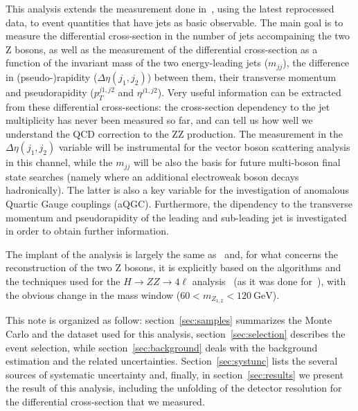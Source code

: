 This analysis extends the measurement done in~\cite{ZZXSPaper}, using the latest reprocessed data, to event quantities that have jets as basic observable. 
The main goal is to measure the differential cross-section in the number of jets accompaining the two Z bosons, as well as the measurement of the 
differential cross-section as a function of the invariant mass of the two energy-leading jets ($m_{jj}$), the  difference in (pseudo-)rapidity ($\Delta \eta(j_1 , j_2)$) between them, their transverse momentum and pseudorapidity ($p_T^{j1,j2}$ and $\eta^{j1,j2}$).
Very useful information can be extracted from these differential cross-sections: the cross-section dependency to the jet multiplicity has never been measured so far, and can tell us how well
we understand the QCD correction to the ZZ production. The measurement in the $\Delta \eta(j_1 , j_2)$ variable will be instrumental for the vector boson scattering analysis in this channel, 
while the $m_{jj}$ will be also the basis for future multi-boson final state searches (namely where an additional electroweak boson decays hadronically). The latter is also a key variable for the investigation of anomalous Quartic Gauge couplings (aQGC). Furthermore, the dipendency to the transverse momentum and pseudorapidity of the leading and sub-leading jet is investigated in order to obtain further information.

The implant of the analysis is largely the same as~\cite{ZZXSPaper} and, for what concerns the reconstruction of the two Z bosons, it is explicitly
based on the algorithms and the techniques used for the $H\rightarrow ZZ \rightarrow 4\ell$ analysis~\cite{HiggsLegacyPaper} (as it was done for~\cite{ZZXSPaper}), with the obvious change in the mass window ($60 < m_{Z_{1,2}} < 120~\mathrm{GeV}$). %


This note is organized as follow: section~\ref{sec:samples} summarizes the Monte Carlo and the dataset used for this analysis, section~\ref{sec:selection} describes the event selection, 
while section~\ref{sec:background} deals with the background estimation and the related uncertainties. Section~\ref{sec:systunc} lists the several sources of systematic uncertainty and, finally, in section~\ref{sec:results} we present the result of this analysis,
including the unfolding of the detector resolution for the differential cross-section that we measured.
 
